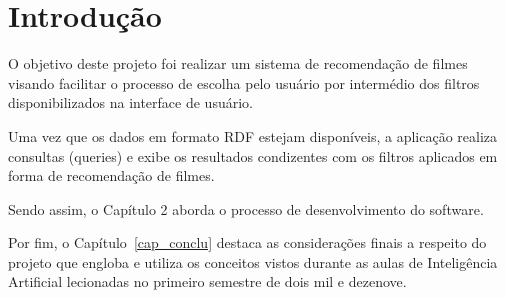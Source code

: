 \chapter{Introdução}\label{cap_intro}

 O objetivo deste projeto foi realizar um sistema de recomendação de filmes visando facilitar o processo de escolha pelo usuário por intermédio dos filtros disponibilizados na interface de usuário.

Uma vez que os dados em formato RDF estejam disponíveis, a aplicação realiza consultas (queries) e exibe os resultados condizentes com os filtros aplicados em forma de recomendação de filmes.

Sendo assim, o Capítulo 2 aborda o processo de desenvolvimento do software.

Por fim, o Capítulo~\ref{cap_conclu} destaca as considerações finais a respeito do projeto que engloba e utiliza os conceitos vistos durante as aulas de Inteligência Artificial lecionadas no primeiro semestre de dois mil e dezenove.
